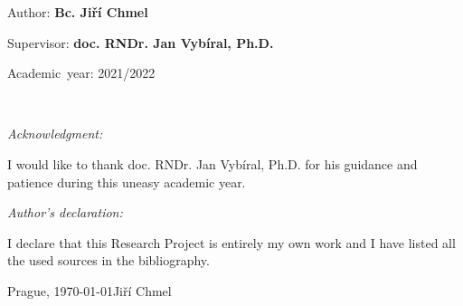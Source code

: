 \documentclass[11pt,american]{book} %
\theoremstyle{plain}
\theoremstyle{definition}
\newenvironment{lyxlist}[1]
{\begin{list}{}
		{\settowidth{\labelwidth}{#1}
			\setlength{\leftmargin}{\labelwidth}
			\addtolength{\leftmargin}{\labelsep}
			\renewcommand{\makelabel}[1]{##1\hfil}}}
	{\end{list}}
\begin{document}
\vfill{}

\begin{lyxlist}{MMMMMMMMM}
	\begin{singlespace}
		\item [{Author:}] \textbf{Bc. Jiří Chmel}
		\item [{Supervisor:}] \textbf{doc. RNDr. Jan Vybíral, Ph.D.}
	\end{singlespace}
	
	\begin{singlespace}
		\item [{Academic~year:}] 2021/2022\end{singlespace}
	
\end{lyxlist}
\newpage{}

~\newpage{}




%
%
%
%
%
%
%
%
%
%

\noindent \emph{\Large{}Acknowledgment:}{\Large \par}

\noindent I would like to thank doc. RNDr. Jan Vybíral, Ph.D.
for his guidance and patience during this uneasy academic year.

\vfill

\noindent \emph{\Large{}Author's declaration:}{\Large \par}

\noindent I declare that this Research Project is entirely
my own work and I have listed all the used sources in the bibliography.

\bigskip{}


\noindent Prague, \today \hfill{}Jiří Chmel
\vspace{2cm}
\end{document}
